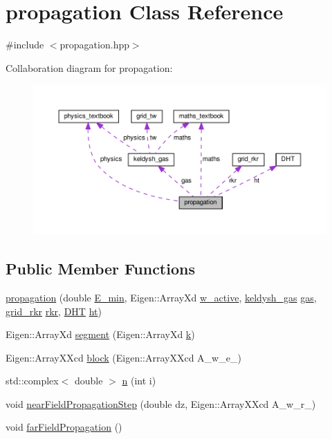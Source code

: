 \hypertarget{classpropagation}{}\section{propagation Class Reference}
\label{classpropagation}


{\ttfamily \#include $<$propagation.\+hpp$>$}



Collaboration diagram for propagation\+:\nopagebreak
\begin{figure}[H]
\begin{center}
\leavevmode
\includegraphics[width=350pt]{classpropagation__coll__graph}
\end{center}
\end{figure}
\subsection*{Public Member Functions}
\begin{DoxyCompactItemize}
\item 
\hyperlink{classpropagation_a2580bb2332faef03bfb6d761ee55bb6d}{propagation} (double \hyperlink{classpropagation_ab5a753d760a135806a93b9082e8019fb}{E\+\_\+min}, Eigen\+::\+Array\+Xd \hyperlink{classpropagation_a4c24f42d4148eded469c6479d6bf1661}{w\+\_\+active}, \hyperlink{classkeldysh__gas}{keldysh\+\_\+gas} \hyperlink{classpropagation_a4152dc9a226a7ff91aff2338d0bd813f}{gas}, \hyperlink{classgrid__rkr}{grid\+\_\+rkr} \hyperlink{classpropagation_a3d37531bb5918f972544d242aec7e72b}{rkr}, \hyperlink{class_d_h_t}{D\+HT} \hyperlink{classpropagation_a044544975e7fc2ec3df9a55d92f8cc90}{ht})
\item 
Eigen\+::\+Array\+Xd \hyperlink{classpropagation_a39126bbbd4977c140c0077b849e78bc1}{segment} (Eigen\+::\+Array\+Xd \hyperlink{classpropagation_a49a30e941421cd5e3f0b62bd1335a767}{k})
\item 
Eigen\+::\+Array\+X\+Xcd \hyperlink{classpropagation_af12b15d9b91f98516c0ff25efc1233d1}{block} (Eigen\+::\+Array\+X\+Xcd A\+\_\+w\+\_\+e\+\_\+)
\item 
std\+::complex$<$ double $>$ \hyperlink{classpropagation_a7c696d9e54e5f0a7735047e28aee4866}{n} (int i)
\item 
void \hyperlink{classpropagation_a65e272beb6b5b73f433456361bcde914}{near\+Field\+Propagation\+Step} (double dz, Eigen\+::\+Array\+X\+Xcd A\+\_\+w\+\_\+r\+\_\+)
\item 
void \hyperlink{classpropagation_a9c2e1cb4e314c173b26de08ffcfe071d}{far\+Field\+Propagation} ()
\end{DoxyCompactItemize}
